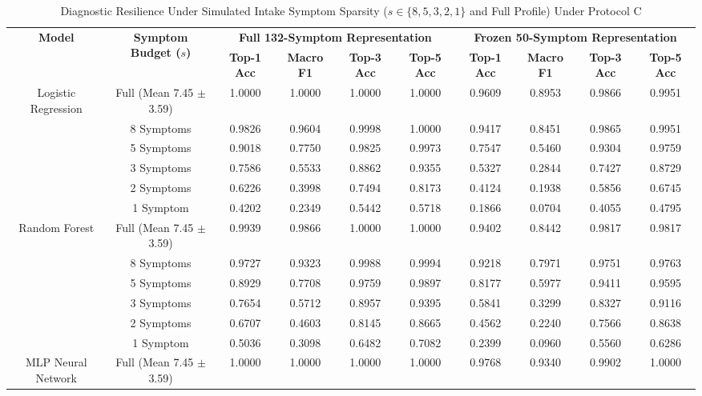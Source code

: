 \begin{table}[!t]
\caption{Diagnostic Resilience Under Simulated Intake Symptom Sparsity ($s \in \{8, 5, 3, 2, 1\}$ and Full Profile) Under Protocol C}
\label{tab:sparsity_summary}
\centering
\begin{tabular}{cc|cccc|cccc}
\toprule
\multirow{2}{*}{\textbf{Model}} & \multirow{2}{*}{\textbf{Symptom Budget ($s$)}} & \multicolumn{4}{c|}{\textbf{Full 132-Symptom Representation}} & \multicolumn{4}{c}{\textbf{Frozen 50-Symptom Representation}} \\
\cmidrule{3-10}
& & \textbf{Top-1 Acc} & \textbf{Macro F1} & \textbf{Top-3 Acc} & \textbf{Top-5 Acc} & \textbf{Top-1 Acc} & \textbf{Macro F1} & \textbf{Top-3 Acc} & \textbf{Top-5 Acc} \\
\midrule
\multirow{6}{*}{Logistic Regression}
& Full (Mean 7.45 $\pm$ 3.59) & 1.0000 & 1.0000 & 1.0000 & 1.0000 & 0.9609 & 0.8953 & 0.9866 & 0.9951 \\
& 8 Symptoms       & 0.9826 & 0.9604 & 0.9998 & 1.0000 & 0.9417 & 0.8451 & 0.9865 & 0.9951 \\
& 5 Symptoms       & 0.9018 & 0.7750 & 0.9825 & 0.9973 & 0.7547 & 0.5460 & 0.9304 & 0.9759 \\
& 3 Symptoms       & 0.7586 & 0.5533 & 0.8862 & 0.9355 & 0.5327 & 0.2844 & 0.7427 & 0.8729 \\
& 2 Symptoms       & 0.6226 & 0.3998 & 0.7494 & 0.8173 & 0.4124 & 0.1938 & 0.5856 & 0.6745 \\
& 1 Symptom        & 0.4202 & 0.2349 & 0.5442 & 0.5718 & 0.1866 & 0.0704 & 0.4055 & 0.4795 \\
\midrule
\multirow{6}{*}{Random Forest}
& Full (Mean 7.45 $\pm$ 3.59) & 0.9939 & 0.9866 & 1.0000 & 1.0000 & 0.9402 & 0.8442 & 0.9817 & 0.9817 \\
& 8 Symptoms       & 0.9727 & 0.9323 & 0.9988 & 0.9994 & 0.9218 & 0.7971 & 0.9751 & 0.9763 \\
& 5 Symptoms       & 0.8929 & 0.7708 & 0.9759 & 0.9897 & 0.8177 & 0.5977 & 0.9411 & 0.9595 \\
& 3 Symptoms       & 0.7654 & 0.5712 & 0.8957 & 0.9395 & 0.5841 & 0.3299 & 0.8327 & 0.9116 \\
& 2 Symptoms       & 0.6707 & 0.4603 & 0.8145 & 0.8665 & 0.4562 & 0.2240 & 0.7566 & 0.8638 \\
& 1 Symptom        & 0.5036 & 0.3098 & 0.6482 & 0.7082 & 0.2399 & 0.0960 & 0.5560 & 0.6286 \\
\midrule
\multirow{6}{*}{MLP Neural Network}
& Full (Mean 7.45 $\pm$ 3.59) & 1.0000 & 1.0000 & 1.0000 & 1.0000 & 0.9768 & 0.9340 & 0.9902 & 1.0000 \\

\end{tabular}
\end{table}
